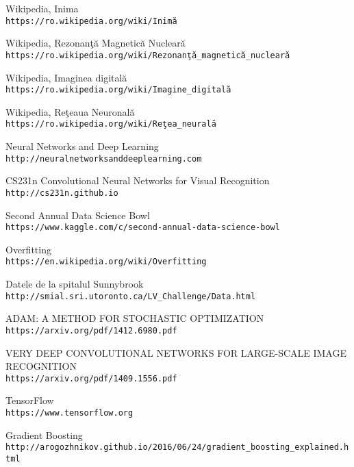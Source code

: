 \begin{thebibliography}{9} 

Wikipedia, Inima
\\\texttt{https://ro.wikipedia.org/wiki/Inim\u{a}}

Wikipedia, Rezonan\c{t}\u{a} Magnetic\u{a} Nuclear\u{a}
\\\texttt{https://ro.wikipedia.org/wiki/Rezonan\c{t}\u{a}\_magnetic\u{a}\_nuclear\u{a}}

Wikipedia, Imaginea digital\u{a}
\\\texttt{https://ro.wikipedia.org/wiki/Imagine\_digital\u{a}}

Wikipedia, Re\c{t}eaua Neuronal\u{a}
\\\texttt{https://ro.wikipedia.org/wiki/Re\c{t}ea\_neural\u{a}}

Neural Networks and Deep Learning
\\\texttt{http://neuralnetworksanddeeplearning.com}

CS231n Convolutional Neural Networks for Visual Recognition
\\\texttt{http://cs231n.github.io}

Second Annual Data Science Bowl
\\\texttt{https://www.kaggle.com/c/second-annual-data-science-bowl}

Overfitting
\\\texttt{https://en.wikipedia.org/wiki/Overfitting}

Datele de la spitalul Sunnybrook
\\\texttt{http://smial.sri.utoronto.ca/LV\_Challenge/Data.html}

ADAM: A METHOD FOR STOCHASTIC OPTIMIZATION
\\\texttt{https://arxiv.org/pdf/1412.6980.pdf}

VERY DEEP CONVOLUTIONAL NETWORKS FOR LARGE-SCALE IMAGE RECOGNITION
\\\texttt{https://arxiv.org/pdf/1409.1556.pdf}

TensorFlow
\\\texttt{https://www.tensorflow.org}

Gradient Boosting
\\\texttt{http://arogozhnikov.github.io/2016/06/24/gradient\_boosting\_explained.html}

\end{thebibliography}
